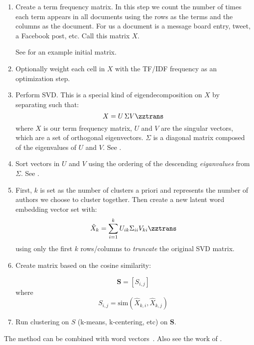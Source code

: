 \documentclass[12pt]{article}
\begin{document}
\begin{enumerate}
\item Create a term frequency matrix.  In this step we count the number of
  times each term appears in all documents using the rows as the terms and the
  columns as the document.  For us a document is a message board entry, tweet,
  a Facebook post, etc.  Call this matrix $X$.

  See  for an example initial matrix.


\item Optionally weight each cell in $X$ with the TF/IDF frequency as an
  optimization step.


\item Perform SVD.  This is a special kind of eigendecomposition on $X$ by
  separating such that:
\[X = U \, \Sigma V\zztrans\]
  where $X$ is our term frequency matrix, $U$ and $V$ are the singular vectors,
  which are a set of orthogonal eigenvectors.
  $\Sigma$ is a diagonal matrix composed of the eigenvalues of $U$ and $V$.
  See .


\item Sort vectors in $U$ and $V$ using the ordering of the descending {\it
    eiganvalues} from $\Sigma$.  See .

\item First, $k$ is set as the number of clusters a priori and represents the
  number of authors we choose to cluster together.  Then create a new latent
  word embedding vector set with:
  \[\hat{X}_k = \sum_{i=1}^{k} U_{ik} \Sigma_{ii} V_{ki}\zztrans\]
  using only the first $k$ rows/columns to {\it truncate} the original SVD
  matrix.


\item Create matrix based on the cosine similarity:

\[ \mathbf{S} = [S_{i,j}] \]
where
\[S_{i,j} = \textrm{sim}(\hat{X}_{k,i}, \hat{X}_{k,j})\]

\item Run clustering on $S$ (k-means, k-centering, etc) on $\mathbf{S}$.
\end{enumerate}

The method can be combined with word
vectors~\cite{mikolovEfficientEstimationWord2013}.  Also see the work of
.


\medskip
\printbibliography\



\end{document}
